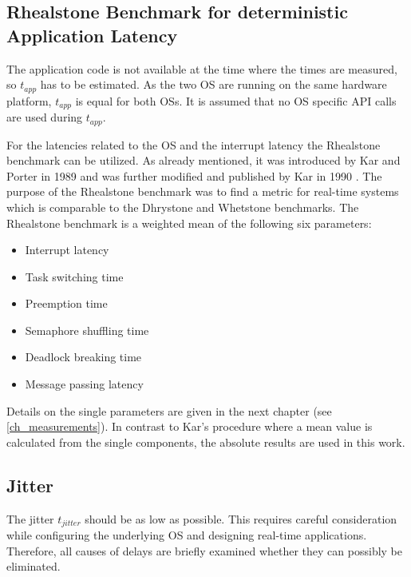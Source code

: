 \subsection{Rhealstone Benchmark for deterministic Application Latency} \label{ss_rhealstone_benchmark_for_deterministic_application_latency}
The application code is not available at the time where the times are measured, so $ t_{app} $ has to be estimated. As the two \ac{OS} are running on the same hardware platform, $ t_{app} $ is equal for both \acp{OS}.
It is assumed that no \ac{OS} specific \ac{API} calls are used during $ t_{app} $.
\par
For the latencies related to the \ac{OS} and the interrupt latency the Rhealstone benchmark can be utilized. 
As already mentioned, it was introduced by Kar and Porter in 1989 \cite{kar:artbp} and was further modified and published by Kar in 1990 \cite{kar:itrb}.
The purpose of the Rhealstone benchmark was to find a metric for real-time systems which is comparable to the Dhrystone \cite{weicker:dasspb} and Whetstone \cite{wichmann:asb} benchmarks.
The Rhealstone benchmark is a weighted mean of the following six parameters:
\begin{itemize}
	\item Interrupt latency
	\item Task switching time
	\item Preemption time
	\item Semaphore shuffling time
	\item Deadlock breaking time
	\item Message passing latency
\end{itemize}
Details on the single parameters are given in the next chapter (see \ref{ch_measurements}).
In contrast to Kar's procedure where a mean value is calculated from the single components, the absolute results are used in this work. 

\subsection{Jitter}\label{ss_jitter2}
The jitter $ t_{jitter} $ should be as low as possible. 
This requires careful consideration while configuring the underlying \ac{OS} and designing real-time applications.
Therefore, all causes of delays are briefly examined whether they can possibly be eliminated.

